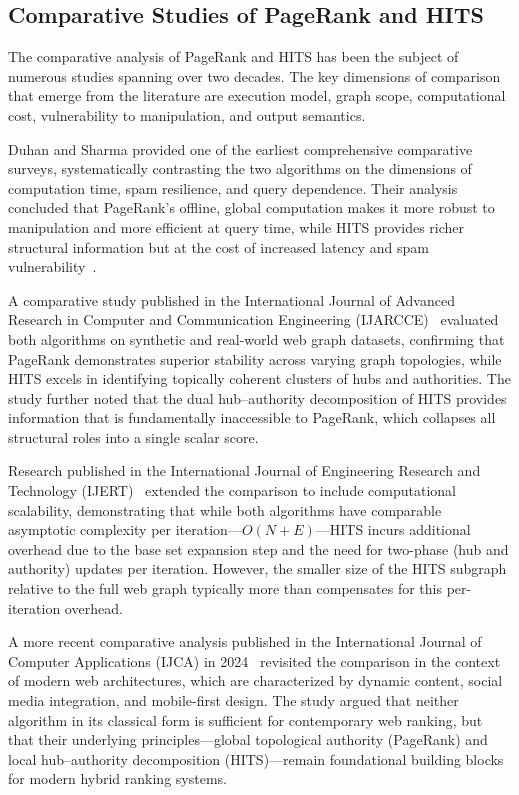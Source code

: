 \subsection{Comparative Studies of PageRank and HITS}
\label{subsec:lit_comparative}

The comparative analysis of PageRank and HITS has been the subject of numerous studies spanning over two decades. The key dimensions of comparison that emerge from the literature are execution model, graph scope, computational cost, vulnerability to manipulation, and output semantics.

Duhan and Sharma provided one of the earliest comprehensive comparative surveys, systematically contrasting the two algorithms on the dimensions of computation time, spam resilience, and query dependence. Their analysis concluded that PageRank's offline, global computation makes it more robust to manipulation and more efficient at query time, while HITS provides richer structural information but at the cost of increased latency and spam vulnerability~\cite{ijarcce_comparative}.

A comparative study published in the International Journal of Advanced Research in Computer and Communication Engineering (IJARCCE)~\cite{ijarcce_comparative} evaluated both algorithms on synthetic and real-world web graph datasets, confirming that PageRank demonstrates superior stability across varying graph topologies, while HITS excels in identifying topically coherent clusters of hubs and authorities. The study further noted that the dual hub--authority decomposition of HITS provides information that is fundamentally inaccessible to PageRank, which collapses all structural roles into a single scalar score.

Research published in the International Journal of Engineering Research and Technology (IJERT)~\cite{ijert_comparative} extended the comparison to include computational scalability, demonstrating that while both algorithms have comparable asymptotic complexity per iteration---$O(N + E)$---HITS incurs additional overhead due to the base set expansion step and the need for two-phase (hub and authority) updates per iteration. However, the smaller size of the HITS subgraph relative to the full web graph typically more than compensates for this per-iteration overhead.

A more recent comparative analysis published in the International Journal of Computer Applications (IJCA) in 2024~\cite{ijca_hits_pagerank_2024} revisited the comparison in the context of modern web architectures, which are characterized by dynamic content, social media integration, and mobile-first design. The study argued that neither algorithm in its classical form is sufficient for contemporary web ranking, but that their underlying principles---global topological authority (PageRank) and local hub--authority decomposition (HITS)---remain foundational building blocks for modern hybrid ranking systems.


